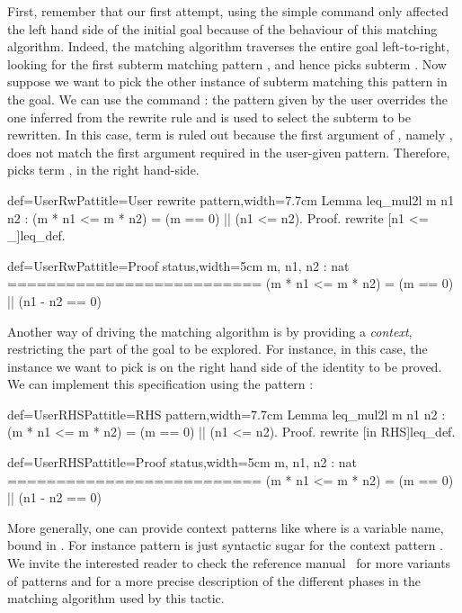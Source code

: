 First, remember that our first attempt, using the simple
 command only
affected the left hand side of the initial goal because of the
behaviour of this matching algorithm.
Indeed, the matching algorithm traverses the entire goal
left-to-right, looking for the first subterm matching pattern
\C{(_ <= _)},  and hence picks subterm .
Now suppose we want to pick
the other instance of subterm matching this pattern in the goal. We
can use the command : the
pattern given by the user overrides the one inferred from the rewrite
rule and is used to select the subterm to be rewritten. In this case,
term  is ruled out because the first argument of
\C{<=}, namely , does not match the first argument 
required in the user-given pattern. Therefore,  picks term
, in the right hand-side.

\begin{coq}{def=UserRwPat}{title=User rewrite pattern,width=7.7cm}
Lemma leq_mul2l m n1 n2 :
(m * n1 <= m * n2) = (m == 0) || (n1 <= n2).
Proof.
rewrite [n1 <= _]leq_def.
\end{coq}
\begin{coqout}{def=UserRwPat}{title=Proof status,width=5cm}
m, n1, n2 : nat
==========================
(m * n1 <= m * n2) =
(m == 0) || (n1 - n2 == 0)
\end{coqout}

Another way of driving the matching algorithm is by providing a
\emph{context}, restricting the part of the goal to be explored. For
instance, in this case, the instance we want to pick is on
the right hand side of the identity to be proved. We can implement
this specification using the pattern \C{[in RHS]}:

\begin{coq}{def=UserRHSPat}{title=RHS pattern,width=7.7cm}
Lemma leq_mul2l m n1 n2 :
(m * n1 <= m * n2) = (m == 0) || (n1 <= n2).
Proof.
rewrite [in RHS]leq_def.
\end{coq}
\begin{coqout}{def=UserRHSPat}{title=Proof status,width=5cm}
m, n1, n2 : nat
==========================
(m * n1 <= m * n2) =
(m == 0) || (n1 - n2 == 0)
\end{coqout}

More generally, one can provide context patterns like \C{[in X in T]}
where  is a variable name, bound in . For instance pattern
\C{[in RHS]} is just syntactic sugar for the context pattern
\C{[in X in _ = X]}.  We invite the interested reader to check the
reference manual~\cite{ssrman} for more variants of patterns and for a
more precise description of the different phases in the matching
algorithm used by this tactic.

